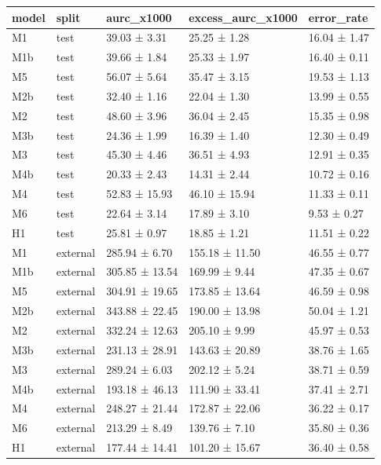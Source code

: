 \begin{tabular}{lllll}
\toprule
model & split & aurc\_x1000 & excess\_aurc\_x1000 & error\_rate \\
\midrule
M1 & test & 39.03 ± 3.31 & 25.25 ± 1.28 & 16.04 ± 1.47 \\
M1b & test & 39.66 ± 1.84 & 25.33 ± 1.97 & 16.40 ± 0.11 \\
M5 & test & 56.07 ± 5.64 & 35.47 ± 3.15 & 19.53 ± 1.13 \\
M2b & test & 32.40 ± 1.16 & 22.04 ± 1.30 & 13.99 ± 0.55 \\
M2 & test & 48.60 ± 3.96 & 36.04 ± 2.45 & 15.35 ± 0.98 \\
M3b & test & 24.36 ± 1.99 & 16.39 ± 1.40 & 12.30 ± 0.49 \\
M3 & test & 45.30 ± 4.46 & 36.51 ± 4.93 & 12.91 ± 0.35 \\
M4b & test & 20.33 ± 2.43 & 14.31 ± 2.44 & 10.72 ± 0.16 \\
M4 & test & 52.83 ± 15.93 & 46.10 ± 15.94 & 11.33 ± 0.11 \\
M6 & test & 22.64 ± 3.14 & 17.89 ± 3.10 & 9.53 ± 0.27 \\
H1 & test & 25.81 ± 0.97 & 18.85 ± 1.21 & 11.51 ± 0.22 \\
M1 & external & 285.94 ± 6.70 & 155.18 ± 11.50 & 46.55 ± 0.77 \\
M1b & external & 305.85 ± 13.54 & 169.99 ± 9.44 & 47.35 ± 0.67 \\
M5 & external & 304.91 ± 19.65 & 173.85 ± 13.64 & 46.59 ± 0.98 \\
M2b & external & 343.88 ± 22.45 & 190.00 ± 13.98 & 50.04 ± 1.21 \\
M2 & external & 332.24 ± 12.63 & 205.10 ± 9.99 & 45.97 ± 0.53 \\
M3b & external & 231.13 ± 28.91 & 143.63 ± 20.89 & 38.76 ± 1.65 \\
M3 & external & 289.24 ± 6.03 & 202.12 ± 5.24 & 38.71 ± 0.59 \\
M4b & external & 193.18 ± 46.13 & 111.90 ± 33.41 & 37.41 ± 2.71 \\
M4 & external & 248.27 ± 21.44 & 172.87 ± 22.06 & 36.22 ± 0.17 \\
M6 & external & 213.29 ± 8.49 & 139.76 ± 7.10 & 35.80 ± 0.36 \\
H1 & external & 177.44 ± 14.41 & 101.20 ± 15.67 & 36.40 ± 0.58 \\
\bottomrule
\end{tabular}
